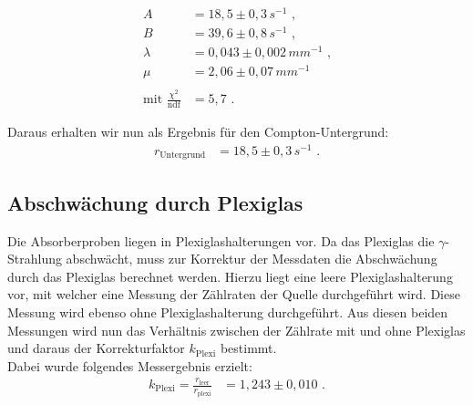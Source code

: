 \begin{align*}
		A&=18,5\pm0,3\,\si{s^{-1}}\text{ ,}\\
		B&=39,6\pm0,8\,\si{s^{-1}}\text{ ,}\\
		\lambda&=0,043\pm0,002\,\si{mm^{-1}}\text{ ,}\\
		\mu&=2,06\pm0,07\,\si{mm^{-1}}\\
		\ \\
		\text{mit }\frac{\chi^2}{\mathrm{ndf}}&=5,7\text{ .}
\end{align*}

Daraus erhalten wir nun als Ergebnis für den Compton-Untergrund:
\begin{align}
	r_\text{Untergrund}&=18,5\pm0,3\,\si{s^{-1}}\text{ .}
\end{align}

\subsection{Abschwächung durch Plexiglas}

Die Absorberproben liegen in Plexiglashalterungen vor. Da das Plexiglas die $\gamma$-Strahlung abschwächt, muss zur Korrektur der Messdaten die Abschwächung durch das Plexiglas berechnet werden. Hierzu liegt eine leere Plexiglashalterung vor, mit welcher eine Messung der Zählraten der Quelle durchgeführt wird. Diese Messung wird ebenso ohne Plexiglashalterung durchgeführt. Aus diesen beiden Messungen wird nun das Verhältnis zwischen der Zählrate mit und ohne Plexiglas und daraus der Korrekturfaktor $k_\text{Plexi}$ bestimmt.\\

Dabei wurde folgendes Messergebnis erzielt:
\begin{align}
	k_\text{Plexi}=\frac{r_\text{leer}}{r_\text{plexi}}&=1,243\pm0,010\text{ .}
\end{align}

